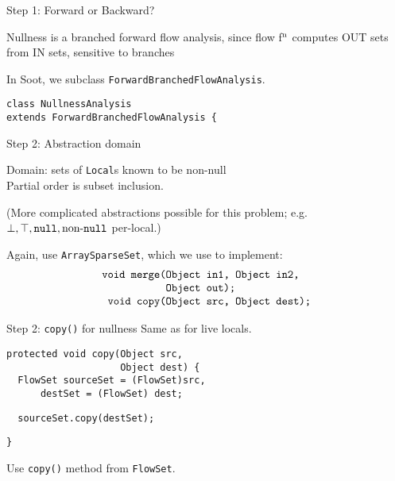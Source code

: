 \begin{slide}{Step 1: Forward or Backward?}

Nullness is a branched forward flow analysis, since flow
f$^{\mbox{\scriptsize n}}$ computes {\sf OUT} sets from {\sf IN} sets, 
sensitive to branches

\qquad

In Soot, we subclass {\tt \red ForwardBranchedFlowAnalysis}.

\qquad

{\small \red \tt class NullnessAnalysis \\ 
           \qquad extends ForwardBranchedFlowAnalysis \{ }
\end{slide}

\begin{slide}{Step 2: Abstraction domain}
\vspace*{-0.2in}

Domain: sets of {\tt Local}s known to be non-null\\
Partial order is subset inclusion.

\quad

(More complicated abstractions possible for this problem; e.g. 
$\perp, \top, \mbox{\tt null}, \mbox{non-{\tt null}}$ per-local.)

\quad

Again, use {\tt ArraySparseSet}, which we use to implement:
{\small 
\[ \mbox{\tt \begin{tabular}{r@{}l}
                 void merge(&Object in1, Object in2,\\
                            &Object out);\\
                 void copy(&Object src, Object dest);
\end{tabular}}\]
}
\end{slide}

\begin{slide}{Step 2: {\tt copy()} for nullness}
Same as for live locals.

\begin{verbatim}
protected void copy(Object src, 
                    Object dest) {
  FlowSet sourceSet = (FlowSet)src,
      destSet = (FlowSet) dest;

\end{verbatim}    
{\red\verb+  sourceSet.copy(destSet);+}
\begin{verbatim}
}
\end{verbatim}

\qquad

Use {\tt copy()} method from {\tt FlowSet}.
\end{slide}

